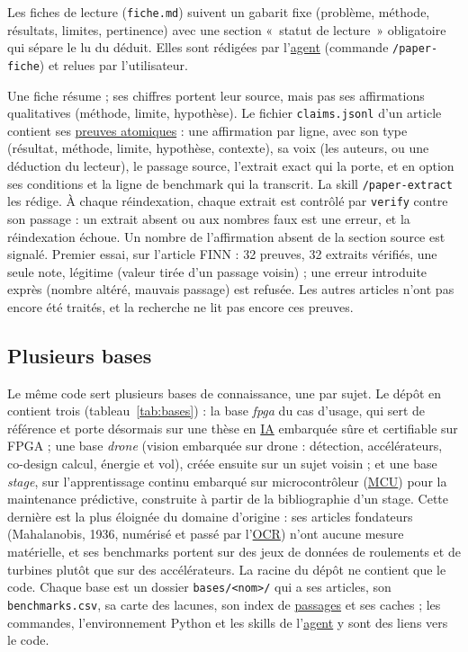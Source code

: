 \documentclass[11pt,a4paper]{article}
\newcommand{\cmd}[1]{\texttt{#1}}
\newcommand{\gl}[2]{\hyperlink{gl:#1}{\textcolor{glcolor}{#2}}}
\begin{document}
Les fiches de lecture (\cmd{fiche.md}) suivent un gabarit fixe (problème, méthode,
résultats, limites, pertinence) avec une section «~statut de lecture~» obligatoire qui
sépare le lu du déduit. Elles sont rédigées par l'\gl{agent}{agent} (commande \cmd{/paper-fiche}) et
relues par l'utilisateur.

Une fiche résume ; ses chiffres portent leur source, mais pas ses affirmations
qualitatives (méthode, limite, hypothèse). Le fichier \cmd{claims.jsonl} d'un article
contient ses \gl{claim}{preuves atomiques} : une affirmation par ligne, avec son type (résultat,
méthode, limite, hypothèse, contexte), sa voix (les auteurs, ou une déduction du lecteur), le
passage source, l'extrait exact qui la porte, et en option ses conditions et la ligne de
benchmark qui la transcrit. La skill \cmd{/paper-extract} les rédige. À chaque
réindexation, chaque extrait est contrôlé par \cmd{verify} contre son passage : un extrait
absent ou aux nombres faux est une erreur, et la réindexation échoue. Un nombre de
l'affirmation absent de la section source est signalé. Premier essai, sur l'article FINN :
32 preuves, 32 extraits vérifiés, une seule note, légitime (valeur tirée d'un passage
voisin) ; une erreur introduite exprès (nombre altéré, mauvais passage) est refusée. Les
autres articles n'ont pas encore été traités, et la recherche ne lit pas encore ces preuves.

\subsection{Plusieurs bases}
\label{sec:bases}

Le même code sert plusieurs bases de connaissance, une par sujet. Le dépôt en contient
trois (tableau~\ref{tab:bases}) : la base \emph{fpga} du cas d'usage, qui sert de référence
et porte désormais sur une thèse en \gl{AI}{IA} embarquée sûre et certifiable sur FPGA ; une base
\emph{drone} (vision embarquée sur drone : détection, accélérateurs, co-design calcul,
énergie et vol), créée ensuite sur un sujet voisin ; et une base \emph{stage}, sur
l'apprentissage continu embarqué sur microcontrôleur (\gl{MCU}{MCU}) pour la maintenance prédictive,
construite à partir de la bibliographie d'un stage. Cette dernière est la plus éloignée du
domaine d'origine : ses articles fondateurs (Mahalanobis, 1936, numérisé et passé par l'\gl{OCR}{OCR})
n'ont aucune mesure matérielle, et ses benchmarks portent sur des jeux de données de
roulements et de turbines plutôt que sur des accélérateurs. La racine du dépôt ne contient
que le code. Chaque base est un dossier \cmd{bases/<nom>/} qui a ses articles, son
\cmd{benchmarks.csv}, sa carte des lacunes, son index de \gl{passage}{passages} et ses caches ; les
commandes, l'environnement Python et les skills de l'\gl{agent}{agent} y sont des liens vers le code.
\end{document}
